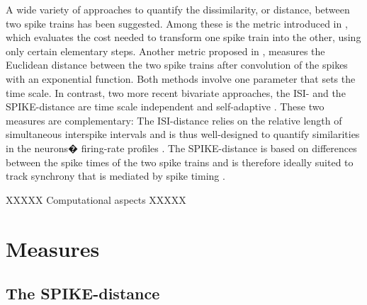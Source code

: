 \documentclass[10pt,twocolumn]{elsart5p}
\begin{document}
A wide variety of approaches to quantify the dissimilarity, or distance, between two spike trains has been suggested. Among these is the metric introduced in \citet{Victor96}, which evaluates the cost needed to transform one spike train into the other, using only certain elementary steps. Another metric proposed in \citet{VanRossum01}, measures the Euclidean distance between the two spike trains after convolution of the spikes with an exponential function. Both methods involve one parameter that sets the time scale. In contrast, two more recent bivariate approaches, the ISI- and the SPIKE-distance are time scale independent and self-adaptive \citep{Kreuz07c, Kreuz13}. These two measures are complementary: The ISI-distance relies on the relative length of simultaneous interspike intervals and is thus well-designed to quantify similarities in the neurons� firing-rate profiles \citep{Kreuz07c, Kreuz09}. The SPIKE-distance is based on differences between the spike times of the two spike trains and is therefore ideally suited to track synchrony that is mediated by spike timing \citep{Kreuz11, Kreuz13}.

XXXXX Computational aspects XXXXX

%
%
\section{\label{s:Measures} Measures}




\subsection{\label{ss:SPIKE-Distance} The SPIKE-distance}
\end{document}
